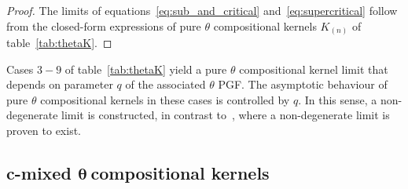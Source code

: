 \documentclass[final, 12pt]{colt2021} %
\newtheorem{prop}{Proposition}
\begin{document}
\begin{proof}
The limits of equations~\eqref{eq:sub_and_critical} and~\eqref{eq:supercritical}
follow from the
closed-form expressions of pure $\theta$ compositional kernels $K_{(n)}$
of table~\ref{tab:thetaK}.
\end{proof}

Cases $3-9$ of table~\ref{tab:thetaK}
yield a pure $\theta$ compositional kernel limit that depends on parameter $q$
of the associated $\theta$ PGF.
The asymptotic behaviour of pure $\theta$ compositional kernels
in these cases is controlled by $q$.
In this sense, a non-degenerate limit is constructed,
in contrast to~\citet{liang2021},
where a non-degenerate limit is proven to exist.








\subsection{c-mixed \texorpdfstring{$\boldsymbol{\theta}~$} ccompositional kernels}
\label{theta_kernels_varying_env}
\end{document}
